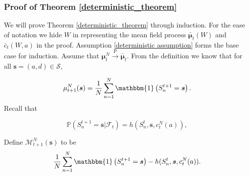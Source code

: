 \documentclass{article}
\theoremstyle{definition}
\begin{document}
    












  




  \subsubsection{Proof of Theorem \ref{deterministic_theorem}} \label{app_proof_DetEv}
  
  We will prove Theorem \ref{deterministic_theorem} through induction. For the ease of notation we hide $W$ in representing the mean field process $\bm{\bar{\mu}}_t(W)$ and $\bar{c}_t(W,a)$ in the proof. Assumption \ref{deterministic assumption} forms the base case for induction. Assume that  $\bm{\mu}^N_{t} \xrightarrow{\text{P}} \bm{\bar{\mu}}_{t} $. From the definition we know that for all $\bm{s}=({a},{d}) \in \mathcal S$,
  

 
  
  
  
  





\[\mu^N_{t+1}(\bm{s}) = \frac{1}{N} \sum\limits_{n=1}^N \mathbbm{1}\left(S^{t+1}_n = \bm{s}\right).\]
Recall that

 $$\mathbb{P}\left( S^{t+1}_n = \bm{s} | \mathcal F_{t} \right) = {h}(S^{t}_n, \bm{s},  c^N_{t}({a})),$$

Define $\mathcal M^N_{t+1}(\bm{s}) $   to be 
\begin{equation*}
  \frac{1}{N} \sum\limits_{n=1}^N \mathbbm{1}\left(S^{t+1}_n = \bm{s}\right) - {h}(S^{t}_n, \bm{s}, c^N_{t}({a})).
\end{equation*}
\end{document}
